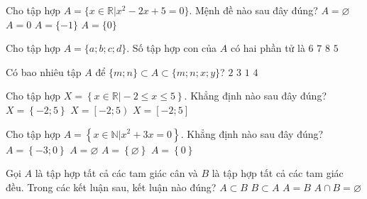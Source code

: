 \begin{ex}%
	Cho tập hợp $A=\{x\in \mathbb{R}|x^2-2x+5=0\}$. Mệnh đề nào sau đây đúng?
	\choice
	{\True $A=\varnothing$}
	{$A=0$}
	{$A=\{-1\}$}
	{$A=\{0\}$}
\end{ex}
\begin{ex}%
	Cho tập hợp $A=\{a;b;c;d\}$. Số tập hợp con của $A$ có hai phần tử là
	\choice
	{\True $6$}
	{$7$}
	{$8$}
	{$5$}
\end{ex}
\begin{ex}%
	Có bao nhiêu tập $A$ để $\{m; n\} \subset A \subset \{m; n; x; y\}$? 
	\choice
	{$2$}
	{$3$}
	{$1$}
	{\True $4$}
\end{ex}
\begin{ex}%
	Cho tập hợp $X = \left\{x \in \mathbb{R}\big|- 2\le x \le 5\right\}$. Khẳng định nào sau đây đúng?
	{$X = \left\{-2;5\right\}$}
	{$X = \left[-2;5\right)$}
	{\True $X = \left[-2;5\right]$}
\end{ex}
\begin{ex}%
	Cho tập hợp $A = \left\{x \in \mathbb{N}\big| x^2 + 3x  = 0\right\}$. Khẳng định nào sau đây đúng?
	\choice
	{$A = \left\{-3;0\right\}$}
	{$A =\varnothing$}
	{$A = \left\{\varnothing\right\}$}
	{\True $ A = \left\{0\right\}$}
\end{ex}
\begin{ex}%
	Gọi $A$ là tập hợp tất cả các tam giác cân và $B$ là tập hợp tất cả các tam giác đều. Trong các kết luận sau, kết luận nào đúng?
	\choice
	{$A \subset B$}
	{\True $B \subset A$}
	{$A=B$}
	{$A \cap B=\varnothing$}
\end{ex}

